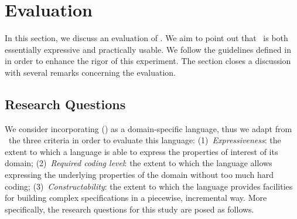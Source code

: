 \section{Evaluation}
\label{sect:evaluation} 


In this section, we discuss an evaluation of \agl. We aim to point out that \agl~is both essentially expressive and practically usable. We follow the guidelines defined in~\cite{runesonGuidelinesConductingReporting2009} in order to  enhance the rigor of this experiment. The section closes a discussion with several remarks concerning the evaluation.

\subsection{Research Questions}
\label{subsect:researchQuestions} 

%

We consider \agl incorporating \dcsl (\agldcsl) as a domain-specific language, thus we adapt from \cite{thakur2019role}~the three criteria in order to evaluate this language: (1)~\textit{Expressiveness}: the extent to which a language is able to express the properties of interest of its domain; (2)~\textit{Required coding level}: the extent to which the language allows expressing the underlying properties of the domain without too much hard coding; (3)~\textit{Constructability}: the extent to which the language provides facilities for building complex specifications in a piecewise, incremental way. More specifically, the research questions for this study are posed as follows.

